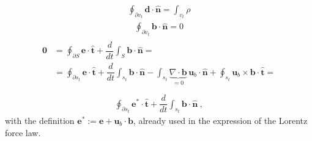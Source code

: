 \documentclass[letterpaper,10pt,italian]{jupyterBook}
\begin{document}
\sphinxAtStartPar
{}
\begin{equation*}
\begin{split}
    \oint_{\partial v_t} \mathbf{d} \cdot \mathbf{\hat{n}} = \int_{v_t} \rho
\end{split}
\end{equation*}
\sphinxAtStartPar
{}
\begin{equation*}
\begin{split}
    \oint_{\partial v_t} \mathbf{b} \cdot \mathbf{\hat{n}} = 0
\end{split}
\end{equation*}
\sphinxAtStartPar
{}
\begin{equation*}
\begin{split}\begin{aligned}
   \mathbf{0} & = \oint_{\partial S} \mathbf{e} \cdot \hat{\mathbf{t}} + \dfrac{d}{dt} \int_{S} \mathbf{b} \cdot \hat{\mathbf{n}} = \\
    & = \oint_{\partial s_t} \mathbf{e} \cdot \hat{\mathbf{t}} + \dfrac{d}{dt} \int_{s_t} \mathbf{b} \cdot \hat{\mathbf{n}} - \int_{s_t} \underbrace{\nabla \cdot \mathbf{b}}_{=0} \, \mathbf{u}_b \cdot \hat{\mathbf{n}} + \oint_{s_t} \mathbf{u}_b \times \mathbf{b} \cdot \hat{\mathbf{t}} =  \\
\end{aligned}\end{split}
\end{equation*}\begin{equation*}
\begin{split}
    \oint_{\partial s_t} \mathbf{e}^* \cdot \hat{\mathbf{t}} + \dfrac{d}{dt} \int_{s_t} \mathbf{b} \cdot \hat{\mathbf{n}} \ ,
\end{split}
\end{equation*}
\sphinxAtStartPar
with the definition \(\mathbf{e}^* := \mathbf{e} + \mathbf{u}_b \cdot \mathbf{b}\), already used in the expression of the Lorentz force law.
\end{document}
